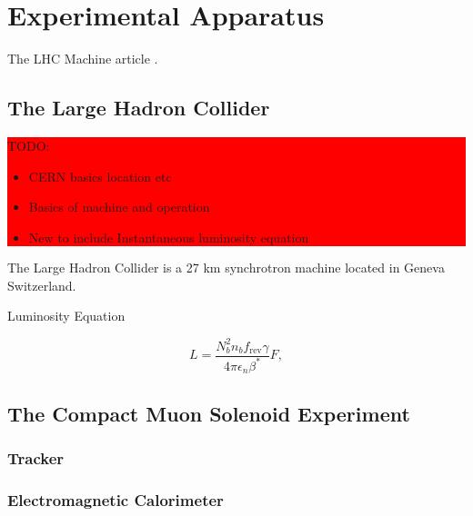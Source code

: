 \chapter{Experimental Apparatus}
\label{CHAPTER:ExperimentalApparatus}




The LHC Machine article \cite{ARTICLE:LHC Machine}.
%

\section{The Large Hadron Collider}
\label{SECTION:ExperimentalApparatus_LHC}

\colorbox{red}{
\begin{minipage}{\linewidth}
TODO: 

\begin{itemize}
  \item CERN basics location etc
  \item Basics of machine and operation
  \item New to include Instantaneous luminosity equation
\end{itemize}

\end{minipage}
}

The Large Hadron Collider \cite{ARTICLE:LHCMachine} is a 27 km synchrotron machine located in Geneva Switzerland.

Luminosity Equation

\begin{equation}
L=\frac{N_{b}^{2}n_{b}f_{\text{rev}}\gamma}{4\pi\epsilon_{n}\beta^{*}}F,
\end{equation}

\section{The Compact Muon Solenoid Experiment}
\label{SECTION:ExperimentalApparatus_CMS}





\subsection{Tracker}
\label{SUBSECTION:ExperimentalApparatus_CMS_Tracker}

\subsection{Electromagnetic Calorimeter}
\label{SUBSECTION:ExperimentalApparatus_CMS_ECAL}

